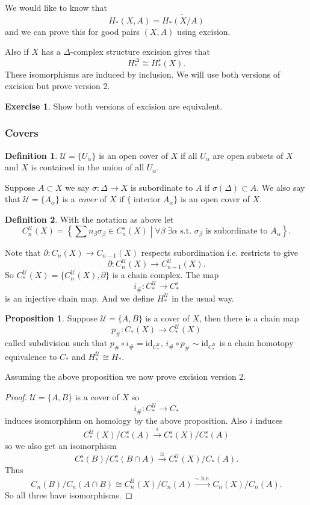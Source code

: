 \documentclass[12pt]{article}
\theoremstyle{definition}
\newtheorem*{prop}{Proposition}
\theoremstyle{definition}
\newtheorem*{defn}{Definition}
\newtheorem*{exer}{Exercise}
\newcommand{\C}{C_*}
\newcommand{\U}{\mathcal{U}}
\renewcommand{\H}{H_*}
\begin{document}
We would like to know that
\[
\H(X,A) = \tilde{\H(X/A)}
\]
and we can prove this for good pairs $(X,A)$ using excision.

Also if $X$ has a $\Delta$-complex structure excision gives that
\[
\H^\Delta \cong \H^s(X).
\]
These isomorphisms are induced by inclusion.
We will use both versions of excision but prove version 2.
\begin{exer}
Show both versions of excision are equivalent.
\end{exer}

\subsubsection{Covers}
\begin{defn}
$\U = \{U_\alpha\}$ is an open cover of $X$ if all $U_\alpha$ are open subsets of $X$ and $X$ is contained in the union of all $U_\alpha$.
\end{defn}

Suppose $A\subset X$ we say $\sigma\colon \Delta \to X$ is subordinate to $A$ if $\sigma(\Delta) \subset A$.
We also say that $\U = \{A_\alpha\}$ is a \emph{cover} of $X$ if $\{\operatorname{interior}A_\alpha\}$ is an open cover of $X$.

\begin{defn}
With the notation as above let
\[
C_n^\U(X) = \left\{ \sum n_\beta \sigma_\beta \in C_n^s(X) \middle| \forall \beta\ \exists \alpha \text{ s.t. } \sigma_\beta \text{ is subordinate to } A_\alpha\right\}.
\]
\end{defn}

Note that $\partial\colon C_n(X) \to C_{n-1}(X)$ respects subordination i.e. restricts to give
\[
\partial\colon C_n^\U (X) \to C_{n-1}^\U(X).
\]
So $\C^\U(X) =\{C_n^\U(X),\partial\}$ is a chain complex.
The map
\[
i_\# \colon \C^\U \to \C^s
\]
is an injective chain map.
And we define $\H^\U$ in the usual way.

\begin{prop}
Suppose $\U = \{A,B\}$ is a cover of $X$, then there is a chain map
\[
p_\# \colon \C(X) \to \C^\U(X)
\]
called subdivision such that $p_\# \circ i_\# = \text{id}_{\C^\U}$, $i_\#\circ p_\# \sim\text{id}_{\C^\U}$ is a chain homotopy equivalence to $\C$ and $\H^\U \cong \H$.
\end{prop}

Assuming the above proposition we now prove excision version 2.
\begin{proof}
$\U = \{A,B\}$ is a cover of $X$ so
\[
i_\# \colon \C^\U \to \C
\]
induces isomorphism on homology by the above proposition.
Also $i$ induces 
\[
\C^\U(X) /\C^s(A) \xrightarrow{i} \C^s(X)/\C^s(A)
\]
so we also get an isomorphism
\[
\C^s(B)/\C^s(B\cap A) \xrightarrow{\cong} \C^\U (X) /\C(A).
\]
Thus 
\[
C_n(B) /C_n(A\cap B) \cong C_n^\U(X)/C_n(A) \xrightarrow{\sim\text{ h.e.}} C_n(X)/C_n(A).
\]
So all three have isomorphisms.
\end{proof}
\end{document}
